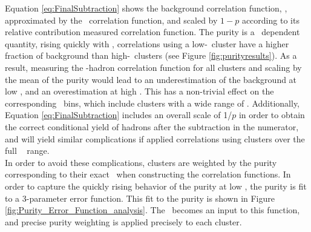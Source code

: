 Equation \ref{eq:FinalSubtraction} shows the background correlation function, \CB, approximated by the \ydecay~correlation function, and scaled by $1-p$ according to its relative contribution measured correlation function. The purity is a \pt~dependent quantity, rising quickly with \pt, correlations using a low-\pt~cluster have a higher fraction of background than high-\pt~clusters (see Figure \ref{fig:purityresults}). As a result, measuring the \ydecay-hadron correlation function for all clusters and scaling by the mean of the purity would lead to an underestimation of the background at low \ptcluster, and an overestimation at high \ptcluster. This has a non-trivial effect on the corresponding \zt~bins, which include clusters with a wide range of \ptcluster. Additionally,  Equation \ref{eq:FinalSubtraction} includes an overall scale of 1/$p$ in order to obtain the correct conditional yield of hadrons after the subtraction in the numerator, and will yield similar complications if applied correlations using clusters over the full \ptcluster~ range.\\

In order to avoid these complications, clusters are weighted by the purity corresponding to their exact \ptcluster~when constructing the correlation functions. In order to capture the quickly rising behavior of the purity at low \ptcluster, the purity is fit to a 3-parameter error function. This fit to the purity is shown in Figure \ref{fig:Purity_Error_Function_analysis}. The \ptcluster~becomes an input to this function, and precise purity weighting is applied precisely to each cluster. 

